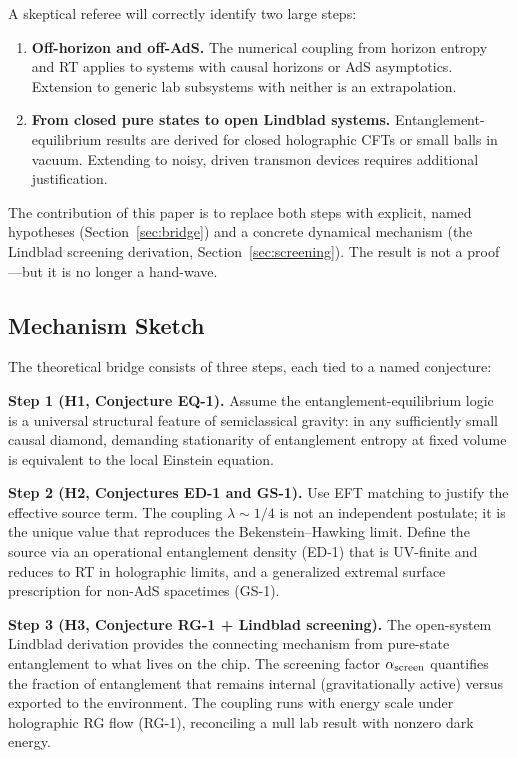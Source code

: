 \documentclass[12pt]{article}
\begin{document}
A skeptical referee will correctly identify two large steps:

\begin{enumerate}
\item \textbf{Off-horizon and off-AdS.} The numerical coupling from horizon entropy and
RT applies to systems with causal horizons or AdS asymptotics. Extension to generic
lab subsystems with neither is an extrapolation.

\item \textbf{From closed pure states to open Lindblad systems.} Entanglement-equilibrium
results are derived for closed holographic CFTs or small balls in vacuum. Extending to
noisy, driven transmon devices requires additional justification.
\end{enumerate}

The contribution of this paper is to replace both steps with explicit, named hypotheses
(Section~\ref{sec:bridge}) and a concrete dynamical mechanism (the Lindblad screening
derivation, Section~\ref{sec:screening}). The result is not a proof---but it is no longer
a hand-wave.

\subsection{Mechanism Sketch}

The theoretical bridge consists of three steps, each tied to a named conjecture:

\medskip
\noindent\textbf{Step 1 (H1, Conjecture EQ-1).} Assume the entanglement-equilibrium
logic~\cite{Jacobson2016,Bueno2017} is a universal structural feature of semiclassical
gravity: in any sufficiently small causal diamond, demanding stationarity of entanglement
entropy at fixed volume is equivalent to the local Einstein equation.

\medskip
\noindent\textbf{Step 2 (H2, Conjectures ED-1 and GS-1).} Use EFT matching to justify
the effective source term. The coupling $\lambda \sim 1/4$ is not an independent
postulate; it is the unique value that reproduces the Bekenstein--Hawking limit. Define
the source via an operational entanglement density (ED-1) that is UV-finite and reduces
to RT in holographic limits, and a generalized extremal surface prescription for non-AdS
spacetimes (GS-1).

\medskip
\noindent\textbf{Step 3 (H3, Conjecture RG-1 + Lindblad screening).} The open-system
Lindblad derivation provides the connecting mechanism from pure-state entanglement to
what lives on the chip. The screening factor $\alpha_{\rm screen}$ quantifies the
fraction of entanglement that remains internal (gravitationally active) versus exported
to the environment. The coupling runs with energy scale under holographic RG flow
(RG-1), reconciling a null lab result with nonzero dark energy.
\end{document}
